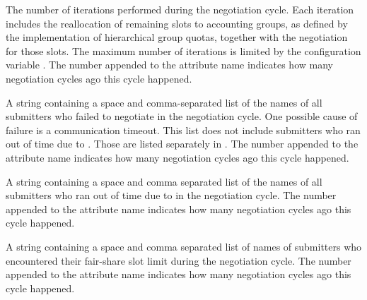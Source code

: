 \begin{description}
\label{attr:LastNegotiationCycleSlotShareIter<X>}
\item[\AdAttr{LastNegotiationCycleSlotShareIter<X>}:] 
The number of iterations performed during the negotiation cycle.
Each iteration includes the reallocation of remaining slots to 
accounting groups,
as defined by the implementation of hierarchical group quotas, 
together with the negotiation for those slots.
The maximum number of iterations is limited by the configuration variable
.
The number  appended to the attribute name indicates 
how many negotiation cycles ago this cycle happened.

\label{attr:LastNegotiationCycleSubmittersFailed<X>}
\item[\AdAttr{LastNegotiationCycleSubmittersFailed<X>}:] A string containing
a space and comma-separated list of the names of all submitters who
failed to negotiate in the negotiation cycle.  One possible cause of
failure is a communication timeout.  This list does not include
submitters who ran out of time due
to .  Those are listed
separately in .
The number  appended to the attribute name indicates how
many negotiation cycles ago this cycle happened.

\label{attr:LastNegotiationCycleSubmittersOutOfTime<X>}
\item[\AdAttr{LastNegotiationCycleSubmittersOutOfTime<X>}:] A string containing
a space and comma separated list of the names of all submitters who
ran out of time due to 
in the negotiation cycle.  The number  appended to the
attribute name indicates how many negotiation cycles ago this cycle
happened.

\label{attr:LastNegotiationCycleSubmittersShareLimit}
\item[\AdAttr{LastNegotiationCycleSubmittersShareLimit}:] 
A string containing a space and comma separated list of names of submitters 
who encountered their fair-share slot limit during the negotiation cycle.  
The number  appended to the attribute name indicates how
many negotiation cycles ago this cycle happened.


\end{description}

